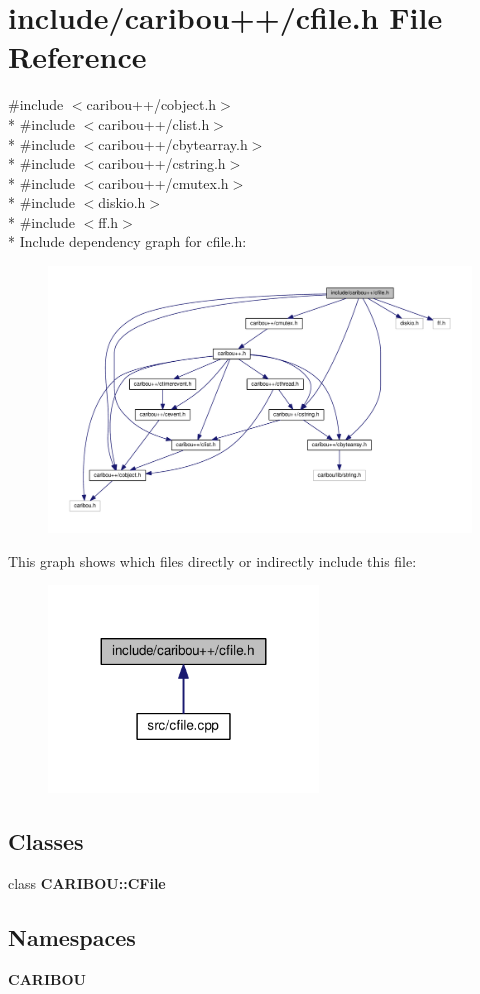 \section{include/caribou++/cfile.h File Reference}
\label{cfile_8h}
{\ttfamily \#include $<$caribou++/cobject.\+h$>$}\\*
{\ttfamily \#include $<$caribou++/clist.\+h$>$}\\*
{\ttfamily \#include $<$caribou++/cbytearray.\+h$>$}\\*
{\ttfamily \#include $<$caribou++/cstring.\+h$>$}\\*
{\ttfamily \#include $<$caribou++/cmutex.\+h$>$}\\*
{\ttfamily \#include $<$diskio.\+h$>$}\\*
{\ttfamily \#include $<$ff.\+h$>$}\\*
Include dependency graph for cfile.\+h\+:
\nopagebreak
\begin{figure}[H]
\begin{center}
\leavevmode
\includegraphics[width=350pt]{cfile_8h__incl}
\end{center}
\end{figure}
This graph shows which files directly or indirectly include this file\+:
\nopagebreak
\begin{figure}[H]
\begin{center}
\leavevmode
\includegraphics[width=203pt]{cfile_8h__dep__incl}
\end{center}
\end{figure}
\subsection*{Classes}
\begin{DoxyCompactItemize}
\item 
class {\bf C\+A\+R\+I\+B\+O\+U\+::\+C\+File}
\end{DoxyCompactItemize}
\subsection*{Namespaces}
\begin{DoxyCompactItemize}
\item 
 {\bf C\+A\+R\+I\+B\+OU}
\end{DoxyCompactItemize}
